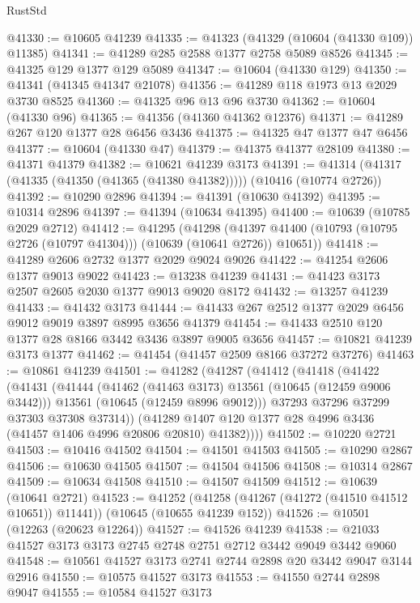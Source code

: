 \begin{lexlean}{RustStd}
\begin{coremodule}
@41330 := @10605 @41239
@41335 := @41323 (@41329 (@10604 (@41330 @109)) @11385)
@41341 := @41289 @285 @2588 @1377 @2758 @5089 @8526
@41345 := @41325 @129 @1377 @129 @5089
@41347 := @10604 (@41330 @129)
@41350 := @41341 (@41345 @41347 @21078)
@41356 := @41289 @118 @1973 @13 @2029 @3730 @8525
@41360 := @41325 @96 @13 @96 @3730
@41362 := @10604 (@41330 @96)
@41365 := @41356 (@41360 @41362 @12376)
@41371 := @41289 @267 @120 @1377 @28 @6456 @3436
@41375 := @41325 @47 @1377 @47 @6456
@41377 := @10604 (@41330 @47)
@41379 := @41375 @41377 @28109
@41380 := @41371 @41379
@41382 := @10621 @41239 @3173
@41391 := @41314 (@41317 (@41335 (@41350 (@41365 (@41380 @41382))))) (@10416 (@10774 @2726))
@41392 := @10290 @2896
@41394 := @41391 (@10630 @41392)
@41395 := @10314 @2896
@41397 := @41394 (@10634 @41395)
@41400 := @10639 (@10785 @2029 @2712)
@41412 := @41295
    (@41298 (@41397 @41400 (@10793 (@10795 @2726 (@10797 @41304))) (@10639 (@10641 @2726)) @10651))
@41418 := @41289 @2606 @2732 @1377 @2029 @9024 @9026
@41422 := @41254 @2606 @1377 @9013 @9022
@41423 := @13238 @41239
@41431 := @41423 @3173 @2507 @2605 @2030 @1377 @9013 @9020 @8172
@41432 := @13257 @41239
@41433 := @41432 @3173
@41444 := @41433 @267 @2512 @1377 @2029 @6456 @9012 @9019 @3897 @8995 @3656 @41379
@41454 := @41433 @2510 @120 @1377 @28 @8166 @3442 @3436 @3897 @9005 @3656
@41457 := @10821 @41239 @3173 @1377
@41462 := @41454 (@41457 @2509 @8166 @37272 @37276)
@41463 := @10861 @41239
@41501 := @41282
    (@41287
      (@41412
        (@41418
          (@41422
            (@41431
              (@41444
                (@41462 (@41463 @3173) @13561 (@10645 (@12459 @9006 @3442)))
                @13561
                (@10645 (@12459 @8996 @9012)))
              @37293
              @37296
              @37299
              @37303
              @37308
              @37314))
          (@41289 @1407 @120 @1377 @28 @4996 @3436 (@41457 @1406 @4996 @20806 @20810) @41382))))
@41502 := @10220 @2721
@41503 := @10416 @41502
@41504 := @41501 @41503
@41505 := @10290 @2867
@41506 := @10630 @41505
@41507 := @41504 @41506
@41508 := @10314 @2867
@41509 := @10634 @41508
@41510 := @41507 @41509
@41512 := @10639 (@10641 @2721)
@41523 := @41252
    (@41258 (@41267 (@41272 (@41510 @41512 @10651)) @11441))
    (@10645 (@10655 @41239 @152))
@41526 := @10501 (@12263 (@20623 @12264))
@41527 := @41526 @41239
@41538 := @21033 @41527 @3173 @3173 @2745 @2748 @2751 @2712 @3442 @9049 @3442 @9060
@41548 := @10561 @41527 @3173 @2741 @2744 @2898 @20 @3442 @9047 @3144 @2916
@41550 := @10575 @41527 @3173
@41553 := @41550 @2744 @2898 @9047
@41555 := @10584 @41527 @3173

\end{coremodule}
\end{lexlean}
